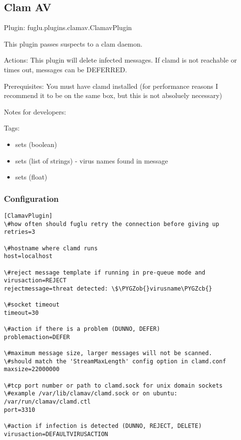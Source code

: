 \documentclass[letterpaper,10pt,english]{sphinxmanual}
\def\PYGZob{\char`\{}
\def\PYGZcb{\char`\}}
\begin{document}
\subsection{Clam AV}
\label{plugins-index:clam-av}
Plugin: fuglu.plugins.clamav.ClamavPlugin

This plugin passes suspects to a clam daemon.

Actions: This plugin will delete infected messages. If clamd is not reachable or times out, messages can be DEFERRED.

Prerequisites: You must have clamd installed (for performance reasons I recommend it to be on the same box, but this is not absoluely necessary)

Notes for developers:

Tags:
\begin{itemize}
\item {} 
sets  (boolean)

\item {} 
sets  (list of strings) - virus names found in message

\item {} 
sets  (float)

\end{itemize}


\subsubsection{Configuration}
\label{plugins-index:id1}
\begin{Verbatim}[commandchars=\\\{\}]
[ClamavPlugin]
\#how often should fuglu retry the connection before giving up
retries=3

\#hostname where clamd runs
host=localhost

\#reject message template if running in pre-queue mode and virusaction=REJECT
rejectmessage=threat detected: \$\PYGZob{}virusname\PYGZcb{}

\#socket timeout
timeout=30

\#action if there is a problem (DUNNO, DEFER)
problemaction=DEFER

\#maximum message size, larger messages will not be scanned.
\#should match the 'StreamMaxLength' config option in clamd.conf
maxsize=22000000

\#tcp port number or path to clamd.sock for unix domain sockets
\#example /var/lib/clamav/clamd.sock or on ubuntu: /var/run/clamav/clamd.ctl
port=3310

\#action if infection is detected (DUNNO, REJECT, DELETE)
virusaction=DEFAULTVIRUSACTION
\end{Verbatim}
\end{document}
